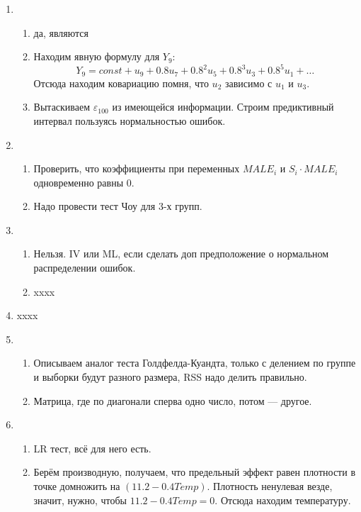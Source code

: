 \begin{enumerate}
    \item \begin{enumerate}
    \item да, являются
    \item Находим явную формулу для $Y_9$:
    \[
    Y_9 = const + u_9 + 0.8 u_7 + 0.8^2 u_5 + 0.8^3 u_3 + 0.8^5 u_1 + \ldots
    \]
    Отсюда находим ковариацию помня, что $u_2$ зависимо с $u_1$ и $u_3$.

    \item 
    Вытаскиваем $\varepsilon_{100}$ из имеющейся информации.
    Строим предиктивный интервал пользуясь нормальностью ошибок.
    \end{enumerate}
    \item \begin{enumerate}
            \item Проверить, что коэффициенты при переменных $MALE_i$ и $S_i\cdot MALE_i$ одновременно равны 0. 

            \item Надо провести тест Чоу для 3-х групп.
    \end{enumerate}

\item \begin{enumerate}
\item  Нельзя. IV или ML, если сделать доп предположение о нормальном распределении ошибок.
\item xxxx
\end{enumerate}
    
\item xxxx
\item \begin{enumerate}
    \item Описываем аналог теста Голдфелда-Куандта, только с делением по группе и выборки будут разного размера, 
    RSS надо делить правильно.
    
    \item Матрица, где по диагонали сперва одно число, потом — другое.
    
\end{enumerate}

\item \begin{enumerate}
    \item LR тест, всё для него есть.
    
    \item Берём производную, получаем, что предельный эффект равен плотности в точке домножить на $(11.2 - 0.4Temp)$. 
    Плотность ненулевая везде, значит, нужно, чтобы $11.2 - 0.4Temp=0$. Отсюда находим температуру.
    

\end{enumerate}
\end{enumerate}
